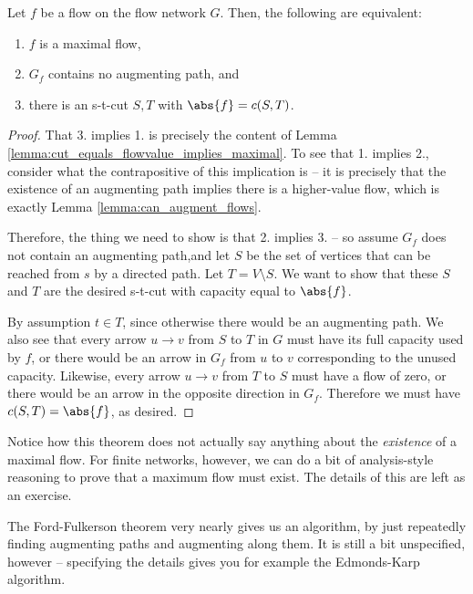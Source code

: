 \documentclass[nobib]{tufte-handout}
\begin{document}
\begin{theorem}
    Let $f$ be a flow on the flow network $G$. Then, the following are equivalent:
    \begin{enumerate}
        \item $f$ is a maximal flow,
        \item $G_f$ contains no augmenting path, and
        \item there is an s-t-cut $S,T$ with $\abs{f} = c(S,T)$.
    \end{enumerate}

    \begin{proof}
        That 3. implies 1. is precisely the content of Lemma \ref{lemma:cut_equals_flowvalue_implies_maximal}. To see that 1. implies 2., consider what the contrapositive of this implication is -- it is precisely that the existence of an augmenting path implies there is a higher-value flow, which is exactly Lemma \ref{lemma:can_augment_flows}.

        Therefore, the thing we need to show is that 2. implies 3. -- so assume $G_f$ does not contain an augmenting path,and let $S$ be the set of vertices that can be reached from $s$ by a directed path. Let $T = V \setminus S$. We want to show that these $S$ and $T$ are the desired s-t-cut with capacity equal to $\abs{f}$.
        
        By assumption $t\in T$, since otherwise there would be an augmenting path. We also see that every arrow $u \to v$ from $S$ to $T$ in $G$ must have its full capacity used by $f$, or there would be an arrow in $G_f$ from $u$ to $v$ corresponding to the unused capacity. Likewise, every arrow $u \to v$ from $T$ to $S$ must have a flow of zero, or there would be an arrow in the opposite direction in $G_f$. Therefore we must have $c(S,T) = \abs{f}$, as desired.
    \end{proof}
\end{theorem}

\begin{remark}
    Notice how this theorem does not actually say anything about the \emph{existence} of a maximal flow. For finite networks, however, we can do a bit of analysis-style reasoning to prove that a maximum flow must exist. The details of this are left as an exercise.
\end{remark}

The Ford-Fulkerson theorem very nearly gives us an algorithm, by just repeatedly finding augmenting paths and augmenting along them. It is still a bit unspecified, however -- specifying the details gives you for example the Edmonds-Karp algorithm.
\end{document}
